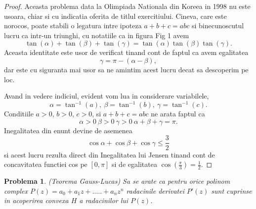 \documentclass[a4paper,12pt,oneside]{report}
\newtheorem{problem}{Problema}
\begin{document}
\begin{proof}
Aceasta problema data la Olimpiada Nationala din Koreea in 1998 nu este usoara, chiar si cu indicatia oferita de titlul exercitiului. Cineva, care este norocos, poate stabili o legatura intre  ipoteza \(a + b + c = abc\) si binecunoscutul lucru ca intr-un triunghi, cu notatiile  ca in figura Fig 1
 avem
 \begin{displaymath}
   \tan\left ( \alpha  \right ) + \tan\left ( \beta   \right ) + \tan\left ( \gamma   \right ) = \tan\left ( \alpha  \right )\tan\left ( \beta   \right )\tan\left ( \gamma   \right ).
 \end{displaymath}
Aceasta identitate este usor de verificat tinand cont de faptul ca avem egalitatea \[\gamma  = \pi  - \left ( \alpha  - \beta  \right ),\] dar este cu siguranta mai usor sa ne amintim acest lucru decat sa descoperim pe loc.

Avand in vedere indiciul, evident vom lua in considerare variabilele,  \[\alpha  = \tan^{-1}\left ( a \right ),~ \beta = \tan ^{-1}\left ( b \right ),~\gamma  = \tan ^{-1}\left ( c \right ).\]
Conditiile \(a> 0\), \(b> 0\), \(c> 0\), si \(a+b+c = abc\) ne arata faptul ca \[\alpha > 0 ~\beta > 0~\gamma > 0~\alpha + \beta + \gamma  = \pi.\] Inegalitatea din enunt devine de asemenea \[\cos \alpha  + \cos \beta  + \cos \gamma  \leq \frac{3}{2}\] si acest lucru rezulta direct din Inegalitatea lui Jensen  tinand cont de  concavitatea functiei cos
 pe \(\left [ 0 , \pi  \right ]\)  si de egalitatea \(\cos \left ( \frac{\pi }{3} \right ) = \frac{1}{2}\).
\end{proof}
\begin{problem} (Teorema Gauss-Lucas)
Sa se arate ca pentru orice polinom complex \(P\left ( z \right ) = a_{0} + a_{1}z + ..... +a_{n}z^{n}\) radacinile derivatei \({P}'\left ( z \right )\) sunt cuprinse in acoperirea convexa \(H\) a radacinilor lui \(P\left ( z \right )\).
\end{problem}
\end{document}
